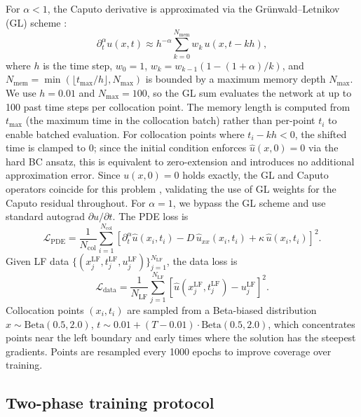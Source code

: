 \documentclass[11pt]{article}
\newcommand{\Lcal}{\mathcal{L}}
\newcommand{\Ncol}{N_{\mathrm{col}}}
\newcommand{\NLF}{N_{\mathrm{LF}}}
\begin{document}
For $\alpha < 1$, the Caputo derivative is approximated via the Gr\"unwald--Letnikov (GL) scheme \cite{meerschaert2004finite,podlubny1999fractional,diethelm2002numerical}:
\begin{equation}
\label{eq:gl}
\partial_t^\alpha u(x, t) \approx h^{-\alpha} \sum_{k=0}^{N_{\mathrm{mem}}} w_k\, u(x, t - kh),
\end{equation}
where $h$ is the time step, $w_0 = 1$, $w_k = w_{k-1}(1 - (1+\alpha)/k)$, and $N_{\mathrm{mem}} = \min(\lfloor t_{\max}/h \rfloor, N_{\mathrm{max}})$ is bounded by a maximum memory depth $N_{\mathrm{max}}$. We use $h = 0.01$ and $N_{\mathrm{max}} = 100$, so the GL sum evaluates the network at up to 100 past time steps per collocation point. The memory length is computed from $t_{\max}$ (the maximum time in the collocation batch) rather than per-point $t_i$ to enable batched evaluation. For collocation points where $t_i - kh < 0$, the shifted time is clamped to $0$; since the initial condition enforces $\hat{u}(x, 0) = 0$ via the hard BC ansatz, this is equivalent to zero-extension and introduces no additional approximation error. Since $u(x,0) = 0$ holds exactly, the GL and Caputo operators coincide for this problem \cite{podlubny1999fractional}, validating the use of GL weights for the Caputo residual throughout. For $\alpha = 1$, we bypass the GL scheme and use standard autograd $\partial u / \partial t$. The PDE loss is
\begin{equation}
\Lcal_{\mathrm{PDE}} = \frac{1}{\Ncol} \sum_{i=1}^{\Ncol} \left[\partial_t^\alpha \hat{u}(x_i, t_i) - D\, \hat{u}_{xx}(x_i, t_i) + \kappa\, \hat{u}(x_i, t_i)\right]^2.
\end{equation}
Given LF data $\{(x_j^{\mathrm{LF}}, t_j^{\mathrm{LF}}, u_j^{\mathrm{LF}})\}_{j=1}^{\NLF}$, the data loss is
\begin{equation}
\Lcal_{\mathrm{data}} = \frac{1}{\NLF} \sum_{j=1}^{\NLF} \left[\hat{u}(x_j^{\mathrm{LF}}, t_j^{\mathrm{LF}}) - u_j^{\mathrm{LF}}\right]^2.
\end{equation}
Collocation points $(x_i, t_i)$ are sampled from a Beta-biased distribution $x \sim \mathrm{Beta}(0.5, 2.0)$, $t \sim 0.01 + (T - 0.01) \cdot \mathrm{Beta}(0.5, 2.0)$, which concentrates points near the left boundary and early times where the solution has the steepest gradients. Points are resampled every 1000 epochs to improve coverage over training.

\subsection{Two-phase training protocol}
\label{sec:twophase}
\end{document}
